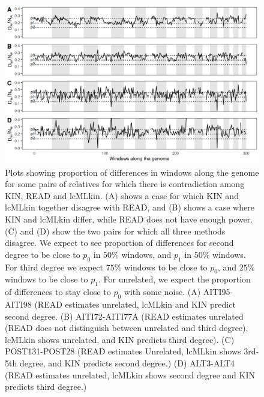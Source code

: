 \documentclass[12pt, letterpaper]{article}
\begin{document}
\begin{figure}[!ht]
    \centering
    \includegraphics[width=18cm]{supplementary_info/plots/egplot1.png}
    \caption{Plots showing proportion of differences in windows along the genome for some pairs of relatives for which there is contradiction among KIN, READ and lcMLkin. (A) shows a case for which KIN and lcMLkin together disagree with READ, and (B) shows a case where KIN and lcMLkin differ, while READ does not have enough power. (C) and (D) show the two pairs for which all three methods disagree. We expect to see proportion of differences for second degree to be close to $p_0$ in $50\%$ windows, and $p_1$ in $50\%$ windows. For third degree we expect $75\%$ windows to be close to $p_0$, and $25\%$ windows to be close to $p_1$. For unrelated, we expect the proportion of differences to stay close to $p_0$ with some noise. (A) AITI95-AITI98 (READ estimates unrelated, lcMLkin and KIN predict second degree. (B) AITI72-AITI77A (READ estimates unrelated (READ does not distinguish between unrelated and third degree), lcMLkin shows unrelated, and KIN predicts third degree). (C) POST131-POST28 (READ estimates Unrelated, lcMLkin shows 3rd-5th degree, and KIN predicts second degree.) (D) ALT3-ALT4 (READ estimates unrelated, lcMLkin shows second degree and KIN predicts third degree.)}
    \label{figS8:eg1}
\end{figure}
\end{document}
